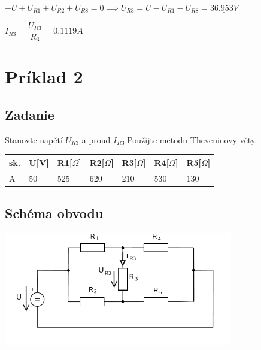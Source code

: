 \documentclass[10pt,a4paper]{article}
\begin{document}
\vspace*{0.5cm}

$-U+U_{R1}+U_{R2}+U_{R8}=0 \implies U_{R3}=U-U_{R1}-U_{R8}=\underline{36.953V}$

\vspace*{0.5cm}

$I_{R3}=\dfrac{U_{R3}}{R_{3}}=\underline{0.1119A}$






 

 \newpage
 \section {Príklad 2}
 
 \subsection*{Zadanie}
 Stanovte napětí $U_{R3}$ a proud $I_{R3}$.Použijte metodu Theveninovy věty.
\begin{center}
    \begin{tabular}{ | l | l | l | l | l | l | l | }
        \hline
        sk. & U[V] & R1[$\Omega$] & R2[$\Omega$] & R3[$\Omega$] & R4[$\Omega$] & R5[$\Omega$]\\ \hline
        A & 50 & 525 & 620 & 210 & 530 & 130 \\ \hline
    \end{tabular}
\end{center}

\subsection*{Schéma obvodu}
\includegraphics[clip, width=10cm]{2.png}


 \vspace*{0.5cm}
 
\end{document}
